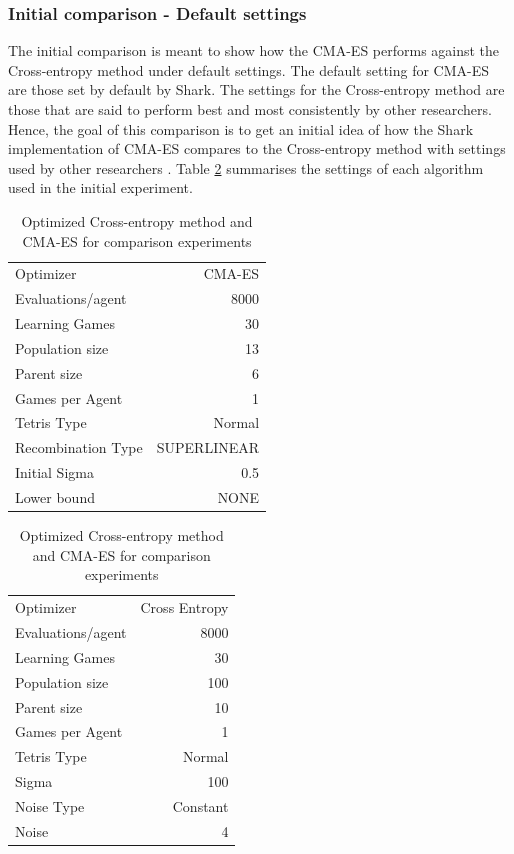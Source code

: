\subsubsection{Initial comparison - Default settings \label{sec:initialCompare}}
The initial comparison is meant to show how the CMA-ES performs against the Cross-entropy method
under default settings. The default setting for CMA-ES are those set by default
by Shark. The settings for the Cross-entropy method are those that are said to perform best
and most
consistently by other researchers.
Hence, the goal of this comparison is to get an initial 
idea of how the Shark implementation of
CMA-ES compares to the Cross-entropy method with settings
used by other researchers \citep{thiery:09}. Table \ref{tab:initialComparisonSettings}
summarises the settings of each algorithm used in the initial experiment.
\begin{table}[H]
\centering
\begin{tabular}{l r}
Optimizer & CMA-ES\\
Evaluations/agent & 8000\\
Learning Games & 30\\
Population size& 13\\
Parent size & 6\\
Games per Agent & 1\\
Tetris Type & Normal\\
\hline
Recombination Type & SUPERLINEAR\\
Initial Sigma & 0.5\\
Lower bound & NONE\\
\end{tabular}
\quad
\begin{tabular}{l r}
Optimizer & Cross Entropy\\
Evaluations/agent & 8000\\
Learning Games & 30\\
Population size & 100\\
Parent size & 10\\
Games per Agent & 1\\
Tetris Type & Normal\\
\hline
Sigma & 100\\
Noise Type & Constant\\
Noise & 4
\end{tabular}
\caption{Optimized Cross-entropy method and CMA-ES for comparison experiments \label{tab:initialComparisonSettings}}
\end{table}


